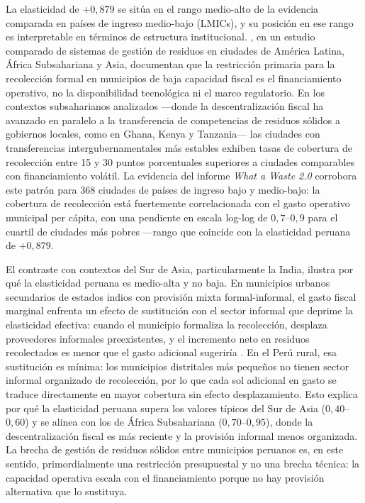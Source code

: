 La elasticidad de $+0{,}879$ se sitúa en el rango medio-alto de la evidencia comparada en países de ingreso medio-bajo (LMICs), y su posición en ese rango es interpretable en términos de estructura institucional.
\citet{Guerrero2013}, en un estudio comparado de sistemas de gestión de residuos en ciudades de América Latina, África Subsahariana y Asia, documentan que la restricción primaria para la recolección formal en municipios de baja capacidad fiscal es el financiamiento operativo, no la disponibilidad tecnológica ni el marco regulatorio.
En los contextos subsaharianos analizados ---donde la descentralización fiscal ha avanzado en paralelo a la transferencia de competencias de residuos sólidos a gobiernos locales, como en Ghana, Kenya y Tanzania--- las ciudades con transferencias intergubernamentales más estables exhiben tasas de cobertura de recolección entre 15 y 30 puntos porcentuales superiores a ciudades comparables con financiamiento volátil.
La evidencia del informe \textit{What a Waste 2.0} \citep{Kaza2018} corrobora este patrón para 368 ciudades de países de ingreso bajo y medio-bajo: la cobertura de recolección está fuertemente correlacionada con el gasto operativo municipal per cápita, con una pendiente en escala log-log de $0{,}7$--$0{,}9$ para el cuartil de ciudades más pobres ---rango que coincide con la elasticidad peruana de $+0{,}879$.

El contraste con contextos del Sur de Asia, particularmente la India, ilustra por qué la elasticidad peruana es medio-alta y no baja.
En municipios urbanos secundarios de estados indios con provisión mixta formal-informal, el gasto fiscal marginal enfrenta un efecto de sustitución con el sector informal que deprime la elasticidad efectiva: cuando el municipio formaliza la recolección, desplaza proveedores informales preexistentes, y el incremento neto en residuos recolectados es menor que el gasto adicional sugeriría \citep{Kaza2018}.
En el Perú rural, esa sustitución es mínima: los municipios distritales más pequeños no tienen sector informal organizado de recolección, por lo que cada sol adicional en gasto se traduce directamente en mayor cobertura sin efecto desplazamiento.
Esto explica por qué la elasticidad peruana supera los valores típicos del Sur de Asia ($0{,}40$--$0{,}60$) y se alinea con los de África Subsahariana ($0{,}70$--$0{,}95$), donde la descentralización fiscal es más reciente y la provisión informal menos organizada.
La brecha de gestión de residuos sólidos entre municipios peruanos es, en este sentido, primordialmente una restricción presupuestal y no una brecha técnica: la capacidad operativa escala con el financiamiento porque no hay provisión alternativa que lo sustituya.

